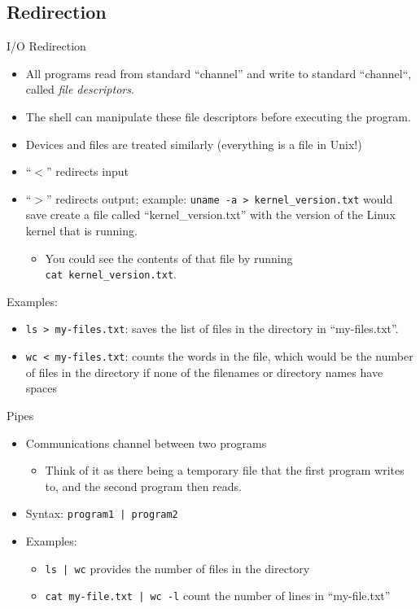 \documentclass[graphics]{beamer}
\begin{document}
\subsection{Redirection}
\begin{frame}{I/O Redirection}
     {
        \begin{itemize}
            \item All programs read from standard ``channel'' and write to standard ``channel``, called \textit{file descriptors}.
            \item The shell can manipulate these file descriptors before executing the program.
            \item Devices and files are treated similarly (everything is a file in Unix!)
            \item ``$<$'' redirects input
            \item ``$>$'' redirects output; example: \texttt{uname -a > kernel\_version.txt} would save create a file called ``kernel\_version.txt'' with the version of the Linux kernel that is running.
            \begin{itemize}
                \item You could see the contents of that file by running \\ \texttt{cat kernel\_version.txt}.
            \end{itemize}
        \end{itemize}
    }
     {
        Examples:
        \begin{itemize}
            \item \texttt{ls > my-files.txt}: saves the list of files in the directory in ``my-files.txt''.
            \item \texttt{wc < my-files.txt}: counts the words in the file, which would be the number of files in the directory if none of the filenames or directory names have spaces
        \end{itemize}
    }
\end{frame}

\begin{frame}{Pipes}
    \begin{itemize}
        \item Communications channel between two programs
        \begin{itemize}
            \item Think of it as there being a temporary file that the first program writes to, and the second program then reads.
        \end{itemize}
        \item Syntax: \texttt{program1 | program2}
        \item Examples:
        \begin{itemize}
            \item \texttt{ls | wc} provides the number of files in the directory
            \item \texttt{cat my-file.txt | wc -l} count the number of lines in ``my-file.txt''
        \end{itemize}
    \end{itemize}
\end{frame}
\end{document}
